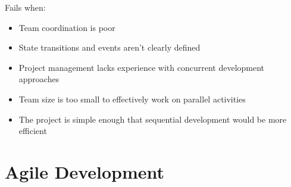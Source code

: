 \documentclass[12pt letter]{report}
\begin{document}
Fails when:
\begin{itemize}
  \item Team coordination is poor
  \item State transitions and events aren't clearly defined
  \item Project management lacks experience with concurrent development approaches
  \item Team size is too small to effectively work on parallel activities
  \item The project is simple enough that sequential development would be more efficient
\end{itemize}

\chapter{Agile Development}
\end{document}
